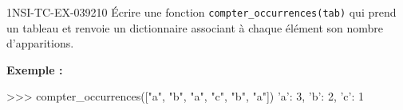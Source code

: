 \begin{exercice}{1NSI-TC-EX-039}{2}{10}
Écrire une fonction \lstinline{compter_occurrences(tab)} qui prend un tableau et
renvoie un dictionnaire associant à chaque élément son nombre d'apparitions.

\textbf{Exemple :}
\begin{console}
>>> compter_occurrences(["a", "b", "a", "c", "b", "a"])
{'a': 3, 'b': 2, 'c': 1}
\end{console}
\end{exercice}
